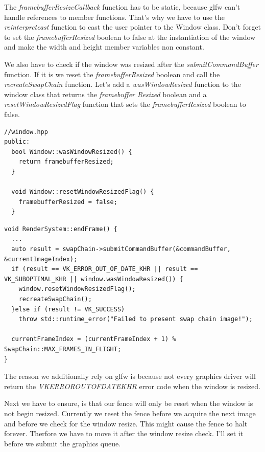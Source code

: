 \documentclass[12pt]{report} \usepackage{preamble}
\begin{document}
The \textit{framebufferResizeCallback} function has to be static, because glfw can't handle references to member functions. That's why we have to use the
\textit{reinterpret\textunderscore cast} function to cast the user pointer to the Window class. Don't forget to set the \textit{framebufferResized} boolean to
false at the instantiation of the window and make the width and height member variables non constant.

We also have to check if the window was resized after the \textit{submitCommandBuffer} function. If it is we reset the \textit{framebufferResized} boolean
and call the \textit{recreateSwapChain} function. Let's add a \textit{wasWindowResized} function to the window class that returns the \textit{framebuffer
	Resized} boolean and a \textit{resetWindowResizedFlag} function that sets the \textit{framebufferResized} boolean to false.

\begin{lstlisting}[Language=C++]
//window.hpp
public:
  bool Window::wasWindowResized() {
    return framebufferResized;
  }

  void Window::resetWindowResizedFlag() {
    framebufferResized = false;
  }
\end{lstlisting}

\begin{lstlisting}[Language=C++]
void RenderSystem::endFrame() {
  ...
  auto result = swapChain->submitCommandBuffer(&commandBuffer, &currentImageIndex);
  if (result == VK_ERROR_OUT_OF_DATE_KHR || result == VK_SUBOPTIMAL_KHR || window.wasWindowResized()) {
    window.resetWindowResizedFlag();
    recreateSwapChain();
  }else if (result != VK_SUCCESS)
    throw std::runtime_error("Failed to present swap chain image!");

  currentFrameIndex = (currentFrameIndex + 1) % SwapChain::MAX_FRAMES_IN_FLIGHT;
}
\end{lstlisting}

The reason we additionally rely on glfw is because not every graphics driver will return the \textit{VK\textunderscore ERROR\textunderscore OUT\textunderscore OF\textunderscore DATE\textunderscore KHR}
error code when the window is resized.

Next we have to ensure, is that our fence will only be reset when the window is not begin resized. Currently we reset the fence before we acquire the next image and before we check for the window resize.
This might cause the fence to halt forever. Therfore we have to move it after the window resize check. I'll set it before we submit the graphics queue.
\end{document}
